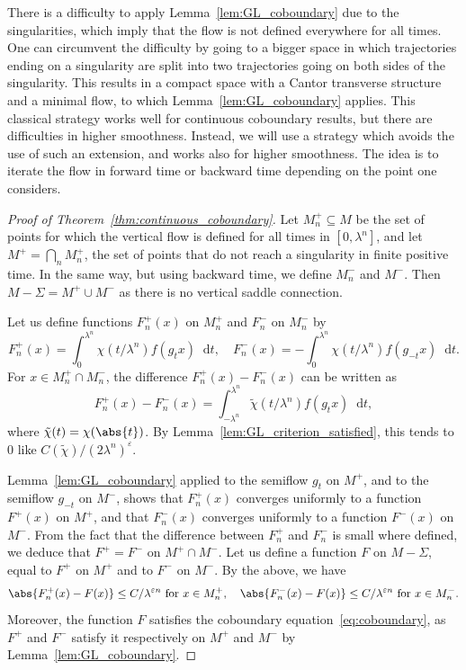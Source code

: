 \documentclass[10pt]{amsart}
\newcommand{\dd}{\mathop{}\!\mathrm{d}}
\let\epsilon\varepsilon
\theoremstyle{definition}
\numberwithin{equation}{section}
\begin{document}
There is a difficulty to apply Lemma~\ref{lem:GL_coboundary} due to the
singularities, which imply that the flow is not defined everywhere for all
times. One can circumvent the difficulty by going to a bigger space in which
trajectories ending on a singularity are split into two trajectories going on
both sides of the singularity. This results in a compact space with a Cantor
transverse structure and a minimal flow, to which
Lemma~\ref{lem:GL_coboundary} applies. This classical strategy works well for
continuous coboundary results, but there are difficulties in higher
smoothness. Instead, we will use a strategy which avoids the use of such an
extension, and works also for higher smoothness. The idea is to iterate the
flow in forward time or backward time depending on the point one considers.

\begin{proof}[Proof of Theorem~\ref{thm:continuous_coboundary}]
Let $M_n^+ \subseteq M$ be the set of points for which the vertical flow is
defined for all times in $[0,\lambda^n]$, and let $M^+ = \bigcap_n M_n^+$,
\ie the set of points that do not reach a singularity in finite positive
time. In the same way, but using backward time, we define $M_n^-$ and $M^-$.
Then $M -\Sigma = M^+ \cup M^-$ as there is no vertical saddle connection.

Let us define functions $F_n^+(x)$ on $M_n^+$ and $F_n^-$ on $M_n^-$ by
\begin{equation*}
F_n^+(x) = \int_0^{\lambda^n} \chi(t/\lambda^n) f(g_t x) \dd t, \quad F_n^-(x) = - \int_0^{\lambda^n} \chi(t/\lambda^n) f(g_{-t} x) \dd t.
\end{equation*}
For $x \in M_n^+ \cap M_n^-$, the difference $F_n^+(x) - F_n^-(x)$ can be
written as
\begin{equation*}
F_n^+(x) - F_n^-(x) = \int_{-\lambda^n}^{\lambda^n} \tilde \chi(t/\lambda^n) f(g_t x) \dd t,
\end{equation*}
where $\tilde \chi(t) = \chi(\abs{t})$. By
Lemma~\ref{lem:GL_criterion_satisfied}, this tends to $0$ like
$C(\tilde\chi)/(2\lambda^n)^\epsilon$.

Lemma~\ref{lem:GL_coboundary} applied to the semiflow $g_t$ on $M^+$, and to
the semiflow $g_{-t}$ on $M^-$, shows that $F_n^+(x)$ converges uniformly to
a function $F^+(x)$ on $M^+$, and that $F_n^-(x)$ converges uniformly to a
function $F^-(x)$ on $M^-$. From the fact that the difference between $F_n^+$
and $F_n^-$ is small where defined, we deduce that $F^+ = F^-$ on $M^+ \cap
M^-$. Let us define a function $F$ on $M-\Sigma$, equal to $F^+$ on $M^+$ and
to $F^-$ on $M^-$. By the above, we have
\begin{equation}
\label{eq:Fn+F}
\abs{F_n^+(x) - F(x)} \leq C/\lambda^{\epsilon n} \text{ for $x \in M_n^+$}, \quad
\abs{F_n^-(x) - F(x)} \leq C/\lambda^{\epsilon n} \text{ for $x \in M_n^-$}.
\end{equation}
Moreover, the function $F$ satisfies the coboundary
equation~\eqref{eq:coboundary}, as $F^+$ and $F^-$ satisfy it respectively on
$M^+$ and $M^-$ by Lemma~\ref{lem:GL_coboundary}.


\end{proof}
\end{document}
